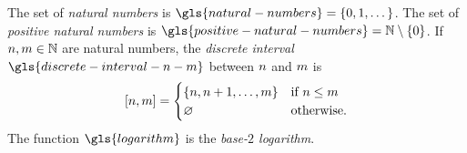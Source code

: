 
The set of \emph{natural numbers} is $\gls{natural-numbers} = \set{0,1,\dots}$.
The set of \emph{positive natural numbers} is $\gls{positive-natural-numbers} =
\Nats \sub \set{0}$.
If $n, m \in \mathbb{N}$ are natural numbers, the \emph{discrete interval}
$\gls{discrete-interval-n-m}$ between $n$ and $m$ is
\[
  [n, m] = \begin{cases}
  \left\{n, n+1, \dots, m\right\} & \text{if } n \leq m \\
  \varnothing & \text{otherwise.}
  \end{cases}
\]
The function $\gls{logarithm}$ is the \emph{base-$2$ logarithm}.